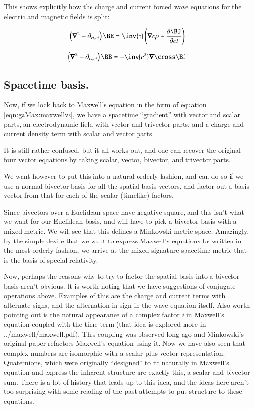 This shows explicitly how the charge and current forced wave equations for the 
electric and magnetic fields is split:

\begin{equation*}
\left(\spacegrad^2 - \partial_{ct, ct}\right) \BE = 
\inv{c } \left(\spacegrad c \rho + \frac{\partial \BJ}{\partial c t} \right)
\end{equation*}

\begin{equation*}
\left(\spacegrad^2 - \partial_{ct, ct}\right) \BB = - \inv{c^2 }  \spacegrad \cross \BJ
\end{equation*}

\subsection{Spacetime basis. }

Now, if we look back to Maxwell's equation in the form of equation \ref{eqn:gaMax:maxwellvs}, we have a spacetime ``gradient'' with vector and scalar parts, an electrodynamic field with vector and trivector parts, and a charge and current density term with scalar and vector parts.  

It is still rather confused, but it all works out, and one can recover the original four vector equations by taking scalar, vector, bivector, and trivector parts. 

We want however to put this into a natural orderly fashion, and can do so if we use a normal bivector basis for all the spatial basis vectors, and factor out a basis vector from that for each of the scalar (timelike) factors.

Since bivectors over a Euclidean space have negative square, and this isn't what we want for our Euclidean basis, and will have to
pick a bivector basis with a mixed metric.  We will see that this defines a Minkowski metric space.  Amazingly, by the simple 
desire that we want to express
Maxwell's equations be written in the most orderly fashion, we arrive at the mixed signature spacetime metric that is the basis
of special relativity.

Now, perhaps the reasons why to try to factor the spatial basis into a bivector basis aren't obvious.  It is worth noting that
we have suggestions of conjugate operations above.  Examples of this are the charge and current terms with alternate signs, and
the alternation in sign in the wave equation itself.  Also worth pointing out is the natural appearance of a complex factor $i$
in Maxwell's equation coupled with the time term (that idea is explored more in ../maxwell/maxwell.pdf).  This coupling was 
observed long ago and Minkowski's original paper refactors Maxwell's equation using it.  Now we have also seen that complex numbers
are isomorphic with a scalar plus vector representation.  Quaternions, which were originally ``designed'' to fit naturally 
in Maxwell's equation and express the inherent structure are exactly this, a scalar and bivector sum.  There is a lot of history
that leads up to this idea, and the ideas here aren't too surprising with some reading of the past attempts to put structure to these
equations.

